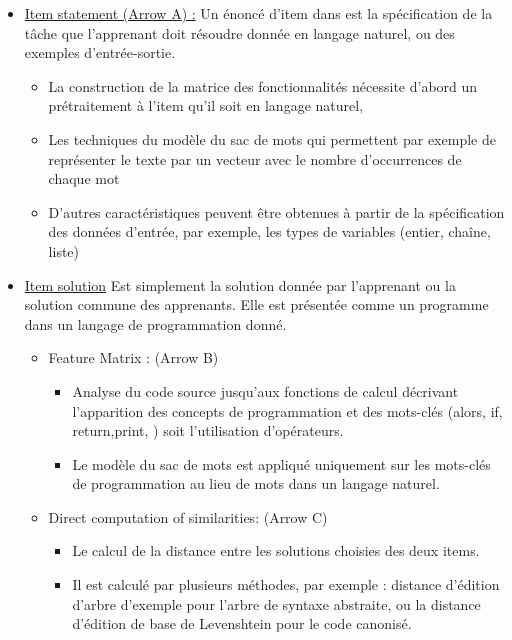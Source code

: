 \begin{itemize}
    \item \underline{Item statement (Arrow A) :} Un énoncé d'item dans est la spécification de la tâche que l'apprenant doit résoudre donnée en langage naturel, ou des exemples d'entrée-sortie.
    
    \begin{itemize}
		\item La construction de la matrice des fonctionnalités nécessite d'abord un prétraitement à l'item qu'il soit en langage naturel,
		\item Les techniques du modèle du sac de mots qui permettent par exemple de représenter le texte par un vecteur avec le nombre d'occurrences de chaque mot
		\item D'autres caractéristiques peuvent être obtenues à partir de la spécification des données d'entrée, par exemple, les types de variables (entier, chaîne, liste)
	\end{itemize}
	
\end{itemize}

\begin{itemize}
    \item \underline{Item solution} Est simplement la solution donnée par l’apprenant ou la solution commune des apprenants. Elle est présentée comme un programme dans un langage de programmation donné.
    
    \begin{itemize}
		\item Feature Matrix : (Arrow B)
		\begin{itemize}
			\item Analyse du code source jusqu'aux fonctions de calcul décrivant l'apparition des concepts de programmation et des mots-clés (alors, if, return,print, ) soit l'utilisation d'opérateurs.
			\item Le modèle du sac de mots est appliqué uniquement sur les mots-clés de programmation au lieu de mots dans un langage naturel.
		\end{itemize}

		\item Direct computation of similarities: (Arrow C)
		\begin{itemize}
			\item Le calcul de la distance entre les solutions choisies des deux items.
			\item Il est calculé par plusieurs méthodes, par exemple : distance d'édition d'arbre d'exemple pour l'arbre de syntaxe abstraite, ou la distance d'édition de base de Levenshtein pour le code canonisé.
		\end{itemize}
	\end{itemize}
	
\end{itemize}

